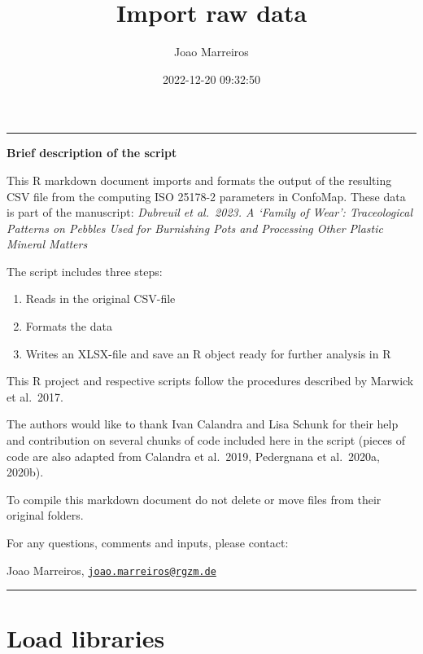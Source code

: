 \documentclass[
]{article}
\title{Import raw data}
\author{Joao Marreiros}
\date{2022-12-20 09:32:50}
\providecommand{\tightlist}{%
  \setlength{\itemsep}{0pt}\setlength{\parskip}{0pt}}
\begin{document}
\maketitle

\begin{center}\rule{0.5\linewidth}{0.5pt}\end{center}

\textbf{Brief description of the script}

This R markdown document imports and formats the output of the resulting
CSV file from the computing ISO 25178-2 parameters in ConfoMap. These
data is part of the manuscript: \emph{Dubreuil et al.~2023. A `Family of
Wear': Traceological Patterns on Pebbles Used for Burnishing Pots and
Processing Other Plastic Mineral Matters}

The script includes three steps:

\begin{enumerate}
\def\labelenumi{\arabic{enumi}.}
\tightlist
\item
  Reads in the original CSV-file\\
\item
  Formats the data\\
\item
  Writes an XLSX-file and save an R object ready for further analysis in
  R
\end{enumerate}

This R project and respective scripts follow the procedures described by
Marwick et al.~2017.

The authors would like to thank Ivan Calandra and Lisa Schunk for their
help and contribution on several chunks of code included here in the
script (pieces of code are also adapted from Calandra et al.~2019,
Pedergnana et al.~2020a, 2020b).

To compile this markdown document do not delete or move files from their
original folders.

For any questions, comments and inputs, please contact:

Joao Marreiros,
\href{mailto:joao.marreiros@rgzm.de}{\nolinkurl{joao.marreiros@rgzm.de}}

\begin{center}\rule{0.5\linewidth}{0.5pt}\end{center}

\hypertarget{load-libraries}{%
\section{Load libraries}\label{load-libraries}}
\end{document}
